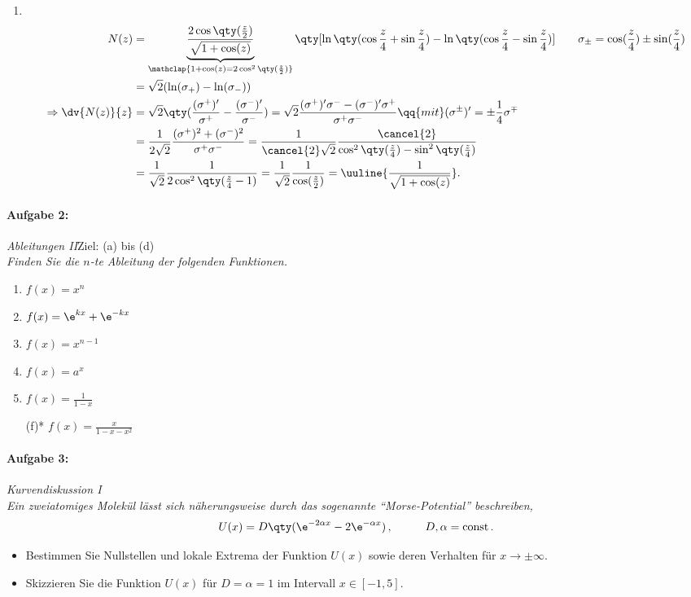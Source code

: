 \begin{enumerate}[label=(\alph*)]
    \item$~$\\[-1.5cm]
    \begin{align}
        N(z) &=\underbrace{\frac{2\cos\qty(\frac{z}{2})}{\sqrt{1+\cos(z)}}}_{\mathclap{1+\cos(z) = 2 \cos^2\qty(\frac{z}{2})}}\qty[\ln\qty(\cos\frac{z}{4}+\sin\frac{z}{4})-\ln\qty(\cos\frac{z}{4}-\sin\frac{z}{4})] \qquad \sigma_{\pm} = \cos(\frac{z}{4})\pm \sin(\frac{z}{4}) \\
        &= \sqrt{2}(\ln(\sigma_+)-\ln(\sigma_-)) \\
        \Rightarrow \dv{N(z)}{z} &= \sqrt{2} \qty(\frac{(\sigma^+)'}{\sigma^+} - \frac{(\sigma^-)'}{\sigma^-}) = \sqrt{2} \frac{(\sigma^+)' \sigma^- - (\sigma^-)'\sigma^+}{\sigma^+ \sigma^-} \qq{mit} (\sigma^\pm)' = \pm \frac{1}{4}\sigma^\mp \\
        &= \frac{1}{2\sqrt{2}} \frac{(\sigma^+)^2 + (\sigma^-)^2}{\sigma^+ \sigma^-} = \frac{1}{\cancel{2}\sqrt{2}} \frac{\cancel{2}}{\cos^2\qty(\frac{z}{4})-\sin^2\qty(\frac{z}{4})} \notag \\
        &= \frac{1}{\sqrt{2}} \frac{1}{2\cos^2\qty(\frac{z}{4}-1)} = \frac{1}{\sqrt{2}} \frac{1}{\cos(\frac{z}{2})} = \uuline{\frac{1}{\sqrt{1+\cos(z)}}}.  
    \end{align}
\end{enumerate}
%
\paragraph{Aufgabe 2: } \emph{Ableitungen II}\hfill Ziel: (a) bis (d)\\[0.2cm]
\emph{Finden Sie die $n$-te Ableitung der folgenden Funktionen.}
    \begin{enumerate}[label=(\alph*)]
        \item $f(x)=x^n$
        \item $f(x)=\e^{kx}+\e^{-kx}$
        \item $f(x)=x^{n-1}$
        \item $f(x)=a^x$ 
        \item $f(x)=\frac{1}{1-x}$
        \item[(f)*] $f(x)=\frac{x}{1-x-x^2}$ 
    \end{enumerate}
%
\paragraph{Aufgabe 3: } \emph{Kurvendiskussion I}\\[0.2cm]
\emph{Ein zweiatomiges Molekül lässt sich näherungsweise durch das sogenannte ``Morse-Potential'' beschreiben,}
\begin{align*}
U(x)=D\qty(\e^{-2\alpha x}-2\e^{-\alpha x})\,, \hspace{1cm} D,\alpha=\operatorname{const}.
\end{align*}
\begin{itemize}
\item Bestimmen Sie Nullstellen und lokale Extrema der Funktion $U(x)$ sowie deren Verhalten für $x \to\pm\infty$.
\item Skizzieren Sie die Funktion $U(x)$ für $D=\alpha=1$ im Intervall $x\in[-1,5]$.
\end{itemize}
%
